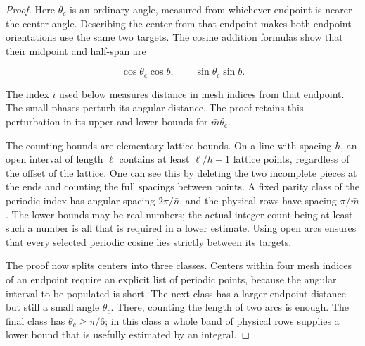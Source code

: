 \begin{proof}
Here $\theta_c$ is an ordinary angle, measured from whichever endpoint
is nearer the center angle.  Describing the center from that endpoint
makes both endpoint orientations use the same two targets.  The
cosine addition formulas show that their midpoint and half-span are

\[
 \cos\theta_c\cos b,\qquad \sin\theta_c\sin b.
\]

The index $i$ used below measures distance in mesh indices from that
endpoint.  The small phases perturb its angular distance. The proof
retains this perturbation in its upper and lower bounds for $\bar{m}\theta_c$.

The counting bounds are elementary lattice bounds.  On a line with
spacing $h$, an open interval of length $\ell$ contains at least
$\ell/h-1$ lattice points, regardless of the offset of the lattice.
One can see this by deleting the two incomplete pieces at the ends
and counting the full spacings between points.  A fixed parity
class of the periodic index has angular spacing $2\pi/\bar{n}$, and the
physical rows have spacing $\pi/\bar{m}$.  The lower bounds may be real
numbers; the actual integer count being at least such a number is
all that is required in a lower estimate.  Using open arcs ensures
that every selected periodic cosine lies strictly between its
targets.

The proof now splits centers into three classes.  Centers within
four mesh indices of an endpoint require an explicit list of
periodic points, because the angular interval to be populated is
short.  The next class has a larger endpoint distance but still a
small angle $\theta_c$.  There, counting the length of two arcs is
enough.  The final class has $\theta_c\geq\pi/6$; in this class a
whole band of physical rows supplies a lower bound that is usefully
estimated by an integral.


\end{proof}
